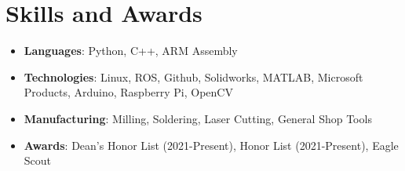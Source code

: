 \documentclass[letterpaper,10pt]{article}
\makeatletter
\newcommand{\resumeItem}[2]{
  \item\small{
    \textbf{#1}{: #2 \vspace{-2pt}}
  }
}
\newcommand{\resumeSubheading}[4]{
  \vspace{-1pt}\item
    \begin{tabular*}{0.97\textwidth}{l@{\extracolsep{\fill}}r}
      \textbf{#1} & \textbf{#2} \\
      \textit{#3} & \textit{#4} \\
    \end{tabular*}\vspace{-5pt}
}
\newcommand{\resumeSubItem}[2]{\resumeItem{#1}{#2}\vspace{-3pt}}
\newcommand{\resumeSubHeadingListStart}{\begin{itemize}[leftmargin=*]}
\newcommand{\resumeSubHeadingListEnd}{\end{itemize}}
\makeatother
\begin{document}
\section{Skills and Awards}
	\resumeSubHeadingListStart
        \resumeSubItem{Languages}{Python, C++, ARM Assembly} %
        \resumeSubItem{Technologies}{Linux, ROS, Github, Solidworks, MATLAB, Microsoft Products, Arduino, Raspberry Pi, OpenCV} %
        \resumeSubItem{Manufacturing}{Milling, Soldering, Laser Cutting, General Shop Tools}
        \resumeSubItem{Awards}{Dean's Honor List (2021-Present), Honor List (2021-Present), Eagle Scout}
    \resumeSubHeadingListEnd
\vspace{-5pt}



\end{document}

